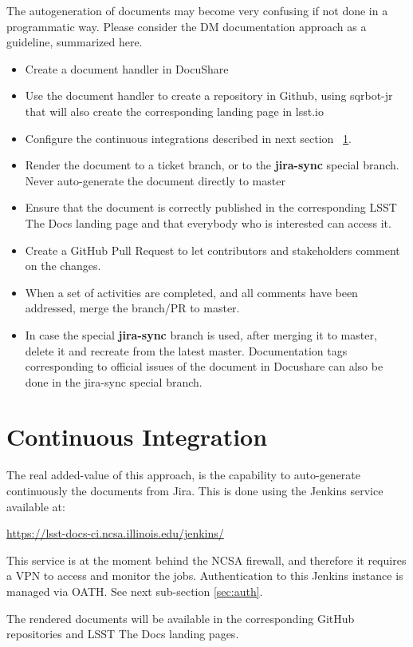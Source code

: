 \documentclass[DM]{lsstdoc}
\begin{document}
The autogeneration of documents may become very confusing if not done in a programmatic way.
Please consider the DM documentation approach as a guideline, summarized here.

\begin{itemize}
\item Create a document handler in DocuShare
\item Use the document handler to create a repository in Github, using sqrbot-jr that will also create the corresponding landing page in lsst.io
\item Configure the continuous integrations described in next section ~\ref{sec:ci}.
\item Render the document to a ticket branch, or to the \textbf{jira-sync} special branch. Never auto-generate the document directly to master
\item Ensure that the document is correctly published in the corresponding LSST The Docs landing page and that everybody who is interested can access it.
\item Create a GitHub Pull Request to let contributors and stakeholders comment on the changes.
\item When a set of activities are completed, and all comments have been addressed, merge the branch/PR to master.
\item In case the special \textbf{jira-sync} branch is used, after merging it to master, delete it  and recreate from the latest master. Documentation tags corresponding to official issues of the document in Docushare can also be done in the jira-sync special branch.
\end{itemize}



\section{Continuous Integration}\label{sec:ci}

The real added-value of this approach, is the capability to auto-generate continuously the documents from Jira.
This is done using the Jenkins service available at:

\url{https://lsst-docs-ci.ncsa.illinois.edu/jenkins/}

This service is at the moment behind the NCSA firewall, and therefore it requires a VPN to access and monitor the jobs.
Authentication to this Jenkins instance is managed via OATH. See next sub-section \ref{sec:auth}.

The rendered documents will be available in the corresponding GitHub repositories and LSST The Docs landing pages.
\end{document}
